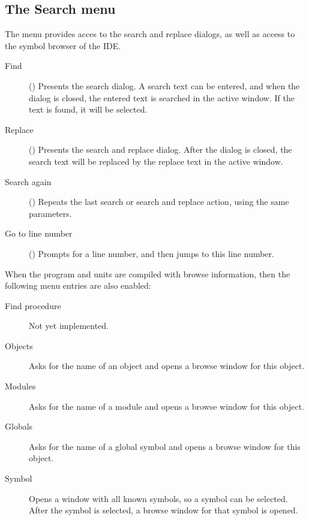 %
%
\subsection{The Search menu}
\label{se:menusearch}
The  menu provides acces to the search and replace dialogs, as well as
access to the symbol browser of the IDE. 
\begin{description}
\item[Find] () Presents the search dialog. A search text 
can be entered, and when the dialog is closed, the entered text is searched
in the active window. If the text is found, it will be selected. 
\item[Replace] () Presents the search and replace dialog.
After the dialog is closed, the search text will be replaced by the replace
text in the active window.
\item[Search again] () Repeats the last search or search and replace action,
 using  the same parameters.
\item[Go to line number] () Prompts for a line number, and
then jumps to this line number.
\end{description}
When the program and units are compiled with browse information, then
the following menu entries are also enabled:
\begin{description}
\item[Find procedure]
Not yet implemented.
\item[Objects]
Asks for the name of an object and opens a browse window for this object.
\item[Modules]
Asks for the name of a module and opens a browse window for this object.
\item[Globals]
Asks for the name of a global symbol and opens a browse window for this object.
\item[Symbol]
Opens a window with all known symbols, so a symbol can be selected. After
the symbol is selected, a browse window for that symbol is opened.
\end{description}
%
%
